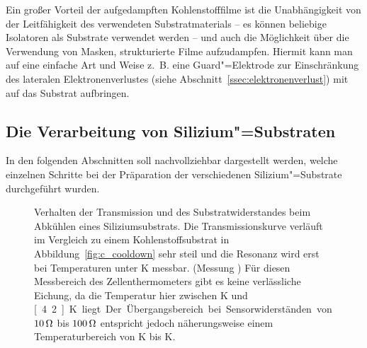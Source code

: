 Ein großer Vorteil der aufgedampften Kohlenstofffilme ist die Unabhängigkeit von der Leitfähigkeit des verwendeten Substratmaterials -- es können beliebige Isolatoren als Substrate verwendet werden -- und auch die Möglichkeit über die Verwendung von Masken, strukturierte Filme aufzudampfen. Hiermit kann man auf eine einfache Art und Weise z.~B. eine Guard"=Elektrode zur Einschränkung des lateralen Elektronenverlustes (siehe Abschnitt~\ref{ssec:elektronenverlust}) mit auf das Substrat aufbringen.

\subsection{Die Verarbeitung von Silizium"=Substraten}
In den folgenden Abschnitten soll nachvollziehbar dargestellt werden, welche einzelnen Schritte bei der Präparation der verschiedenen Silizium"=Substrate durchgeführt wurden.
\begin{figure}[h!tb]
	\hfill%
	\begin{minipage}[b]{\linewidth-\tabcolsep-\smidwidth}
		\caption[Verhalten der Transmission während des Abkühlens eines Si"=Substrats]{Verhalten der Transmission und des Substratwiderstandes beim Abkühlen eines Siliziumsubstrats. Die Transmissionskurve verläuft im Vergleich zu einem Kohlenstoffsubstrat in Abbildung~\ref{fig:c_cooldown} sehr steil und die Resonanz wird erst bei Temperaturen unter \unit[20]{K} messbar. (Messung ) Für diesen Messbereich des Zellenthermometers gibt es keine verlässliche Eichung, da die Temperatur hier zwischen \unit[77]{K} und \unit[4.2]{K} liegt. Der Übergangsbereich  bei Sensorwiderständen von $\unit[10]{\Omega}$ bis $\unit[100]{\Omega}$ entspricht jedoch näherungsweise einem Temperaturbereich von \unit[20]{K} bis \unit[10]{K}.\label{fig:si_cooldown}}
	\end{minipage}
\end{figure}

